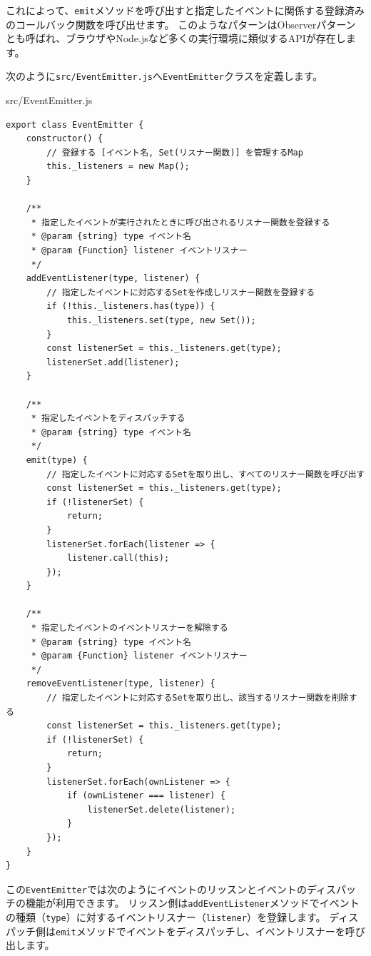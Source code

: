 これによって、\texttt{emit}メソッドを呼び出すと指定したイベントに関係する登録済みのコールバック関数を呼び出せます。
このようなパターンはObserverパターンとも呼ばれ、ブラウザやNode.jsなど多くの実行環境に類似するAPIが存在します。

次のように\texttt{src/EventEmitter.js}へ\texttt{EventEmitter}クラスを定義します。

\begin{listtitle}
src/EventEmitter.js
\end{listtitle}
\begin{lstlisting}
export class EventEmitter {
    constructor() {
        // 登録する [イベント名, Set(リスナー関数)] を管理するMap
        this._listeners = new Map();
    }

    /**
     * 指定したイベントが実行されたときに呼び出されるリスナー関数を登録する
     * @param {string} type イベント名
     * @param {Function} listener イベントリスナー
     */
    addEventListener(type, listener) {
        // 指定したイベントに対応するSetを作成しリスナー関数を登録する
        if (!this._listeners.has(type)) {
            this._listeners.set(type, new Set());
        }
        const listenerSet = this._listeners.get(type);
        listenerSet.add(listener);
    }

    /**
     * 指定したイベントをディスパッチする
     * @param {string} type イベント名
     */
    emit(type) {
        // 指定したイベントに対応するSetを取り出し、すべてのリスナー関数を呼び出す
        const listenerSet = this._listeners.get(type);
        if (!listenerSet) {
            return;
        }
        listenerSet.forEach(listener => {
            listener.call(this);
        });
    }

    /**
     * 指定したイベントのイベントリスナーを解除する
     * @param {string} type イベント名
     * @param {Function} listener イベントリスナー
     */
    removeEventListener(type, listener) {
        // 指定したイベントに対応するSetを取り出し、該当するリスナー関数を削除する
        const listenerSet = this._listeners.get(type);
        if (!listenerSet) {
            return;
        }
        listenerSet.forEach(ownListener => {
            if (ownListener === listener) {
                listenerSet.delete(listener);
            }
        });
    }
}
\end{lstlisting}
\listend

この\texttt{EventEmitter}では次のようにイベントのリッスンとイベントのディスパッチの機能が利用できます。
リッスン側は\texttt{addEventListener}メソッドでイベントの種類（\texttt{type}）に対するイベントリスナー（\texttt{listener}）を登録します。
ディスパッチ側は\texttt{emit}メソッドでイベントをディスパッチし、イベントリスナーを呼び出します。


